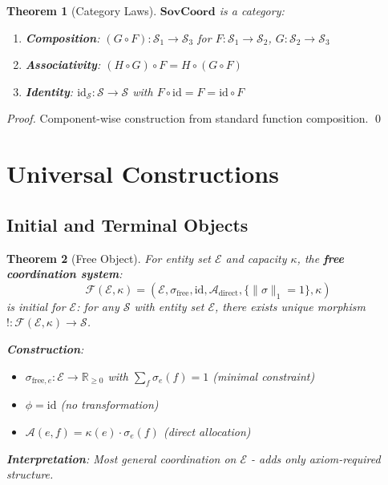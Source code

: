 \documentclass[11pt,a4paper]{article}
\newtheorem{theorem}{Theorem}[section]
\theoremstyle{definition}
\theoremstyle{remark}
\newcommand{\E}{\mathcal{E}}
\newcommand{\A}{\mathcal{A}}
\newcommand{\SovCoord}{\mathbf{SovCoord}}
\begin{document}
\begin{theorem}[Category Laws]
$\SovCoord$ is a category:
\begin{enumerate}
\item \textbf{Composition}: $(G \circ F): \mathcal{S}_1 \to \mathcal{S}_3$ for $F: \mathcal{S}_1 \to \mathcal{S}_2$, $G: \mathcal{S}_2 \to \mathcal{S}_3$
\item \textbf{Associativity}: $(H \circ G) \circ F = H \circ (G \circ F)$
\item \textbf{Identity}: $\text{id}_{\mathcal{S}}: \mathcal{S} \to \mathcal{S}$ with $F \circ \text{id} = F = \text{id} \circ F$
\end{enumerate}
\end{theorem}

\begin{proof}
Component-wise construction from standard function composition. \qed
\end{proof}

\section{Universal Constructions}

\subsection{Initial and Terminal Objects}

\begin{theorem}[Free Object]
\label{thm:free}
For entity set $\E$ and capacity $\kappa$, the \textbf{free coordination system}:
\[ \mathcal{F}(\E, \kappa) = (\E, \sigma_{\text{free}}, \text{id}, \A_{\text{direct}}, \{\|\sigma\|_1 = 1\}, \kappa) \]
is initial for $\E$: for any $\mathcal{S}$ with entity set $\E$, there exists unique morphism $! : \mathcal{F}(\E, \kappa) \to \mathcal{S}$.

\textbf{Construction}:
\begin{itemize}
\item $\sigma_{\text{free},e}: \E \to \mathbb{R}_{\ge 0}$ with $\sum_f \sigma_e(f) = 1$ (minimal constraint)
\item $\phi = \text{id}$ (no transformation)
\item $\A(e,f) = \kappa(e) \cdot \sigma_e(f)$ (direct allocation)
\end{itemize}

\textbf{Interpretation}: Most general coordination on $\E$ - adds only axiom-required structure.
\end{theorem}
\end{document}
